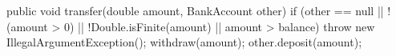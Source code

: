 \begin{unipdcode}[language=Java]
public void transfer(double amount, BankAccount other) {
    if (other == null || !(amount > 0) || !Double.isFinite(amount)
            || amount > balance) {
        throw new IllegalArgumentException();
    }
    withdraw(amount);
    other.deposit(amount);
}
\end{unipdcode}
